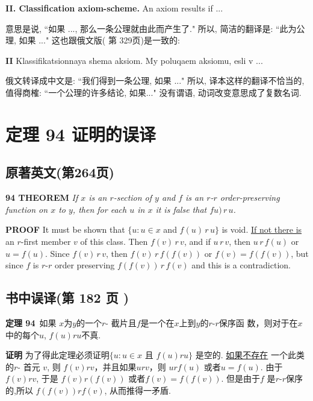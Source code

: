 \documentclass[zihao=-4,a4paper]{ctexart}
\begin{document}
{\bf II. Classification axiom-scheme.} An axiom results if ... 

\noindent 意思是说, “如果 ...,
那么一条公理就由此而产生了." 所以, 简洁的翻译是: “此为公理, 如果 ..."
这也跟俄文版(\cite{jkelley1968ru} 第 329页)是一致的: 

{\bf II}  {\selectfont 
Klassifika{ts}ionna{ya}   {s}hema aksiom.
	My poluqaem aksiomu, esli v ...
}

\noindent 俄文转译成中文是: “我们得到一条公理, 如果 ..."
所以, 译本这样的翻译不恰当的,值得商榷: “一个公理的许多结论, 如果..." 没有谓语, 动词改变意思成了复数名词.







\section{定理 94 证明的误译}

\subsection{原著英文(\cite{jkelley1975}第264页)} 
{\bf 94 THEOREM} 
{\sl
	If $x$ is an $r$-section of $y$ and $f$ is an $r$-$r$ order-preserving function on $x$ to $y$, 
	then for each $u$ in $x$ it is false that $fu)\, r\, u$.
}

{\bf PROOF}
It must be shown that $\{u: u \in x $ and $ f(u) \, r\, u\}$ is void. 
\underline{If not there is} an $r$-first member $v$ of this class.
Then $f(v)\, r\, v $, and if $u\, r\, v$, then $u\, r\, f(u)$ or $u = f(u)$.
Since $f(v)\, r\, v$, then 
\underline{$f(v)\, r\, f(f(v))$}
or $f(v) = f(f(v))$, but since $f$ is $r$-$r$ order preserving
$f(f(v))\, r\, f(v)$ and this is a contradiction.

\subsection{书中误译(\cite{jkelley2010zh}第 182 页 )} 
{\bf 定理 94}\,
{\kaishu
如果 $x$为$y$的一个$r$- 截片且$f$是一个在$x$上到$y$的$r$-$r$保序函
数，则对于在$x$中的每个$u$, $f(u)ru$不真.
}

{\bf 证明}
为了得此定理必须证明$\{u: u \in x $ 且 $ f(u) ru\}$ 是空的. 
\underline{如果不存在}\! 一个此类的$r$- 首元 $v$, 
则 $f(v) r  v $，并且如果$u r v$，则 $u r f(u)$
或者$u = f(u)$.
由于$f(v)rv$, 于是
\underline{$f(v)r(f(v))$}
或者$f(v)=f(f(v))$. 但是由于$f$ 是$r$-$r$保序的,所以
$f(f(v))rf(v)$, 从而推得一矛盾.
\end{document}

